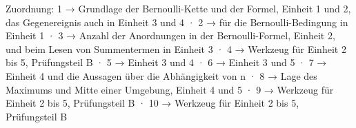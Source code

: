 
Zuordnung: 1 → Grundlage der Bernoulli-Kette und der Formel, Einheit 1 und 2, das Gegenereignis auch in Einheit 3 und 4 · 2 → für die Bernoulli-Bedingung in Einheit 1 · 3 → Anzahl der Anordnungen in der Bernoulli-Formel, Einheit 2, und beim Lesen von Summentermen in Einheit 3 · 4 → Werkzeug für Einheit 2 bis 5, Prüfungsteil B · 5 → Einheit 3 und 4 · 6 → Einheit 3 und 5 · 7 → Einheit 4 und die Aussagen über die Abhängigkeit von n · 8 → Lage des Maximums und Mitte einer Umgebung, Einheit 4 und 5 · 9 → Werkzeug für Einheit 2 bis 5, Prüfungsteil B · 10 → Werkzeug für Einheit 2 bis 5, Prüfungsteil B


